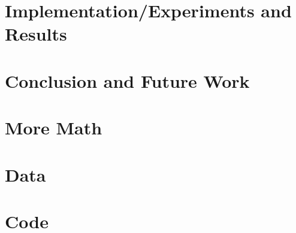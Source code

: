 \documentclass[12pt]{report}
\begin{document}
\chapter{Implementation/Experiments and Results}
\label{chap:results}


\chapter{Conclusion and Future Work}
\label{chap:outro}


\appendix

\chapter{More Math}


\chapter{Data}


\chapter{Code}



\printbibliography[heading=bibintoc,title={References}]
\end{document}
